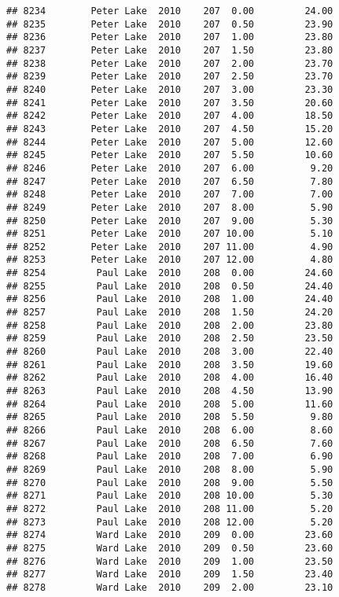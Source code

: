 \documentclass[
]{article}
\begin{document}
\begin{verbatim}
## 8234        Peter Lake  2010    207  0.00         24.00
## 8235        Peter Lake  2010    207  0.50         23.90
## 8236        Peter Lake  2010    207  1.00         23.80
## 8237        Peter Lake  2010    207  1.50         23.80
## 8238        Peter Lake  2010    207  2.00         23.70
## 8239        Peter Lake  2010    207  2.50         23.70
## 8240        Peter Lake  2010    207  3.00         23.30
## 8241        Peter Lake  2010    207  3.50         20.60
## 8242        Peter Lake  2010    207  4.00         18.50
## 8243        Peter Lake  2010    207  4.50         15.20
## 8244        Peter Lake  2010    207  5.00         12.60
## 8245        Peter Lake  2010    207  5.50         10.60
## 8246        Peter Lake  2010    207  6.00          9.20
## 8247        Peter Lake  2010    207  6.50          7.80
## 8248        Peter Lake  2010    207  7.00          7.00
## 8249        Peter Lake  2010    207  8.00          5.90
## 8250        Peter Lake  2010    207  9.00          5.30
## 8251        Peter Lake  2010    207 10.00          5.10
## 8252        Peter Lake  2010    207 11.00          4.90
## 8253        Peter Lake  2010    207 12.00          4.80
## 8254         Paul Lake  2010    208  0.00         24.60
## 8255         Paul Lake  2010    208  0.50         24.40
## 8256         Paul Lake  2010    208  1.00         24.40
## 8257         Paul Lake  2010    208  1.50         24.20
## 8258         Paul Lake  2010    208  2.00         23.80
## 8259         Paul Lake  2010    208  2.50         23.50
## 8260         Paul Lake  2010    208  3.00         22.40
## 8261         Paul Lake  2010    208  3.50         19.60
## 8262         Paul Lake  2010    208  4.00         16.40
## 8263         Paul Lake  2010    208  4.50         13.90
## 8264         Paul Lake  2010    208  5.00         11.60
## 8265         Paul Lake  2010    208  5.50          9.80
## 8266         Paul Lake  2010    208  6.00          8.60
## 8267         Paul Lake  2010    208  6.50          7.60
## 8268         Paul Lake  2010    208  7.00          6.90
## 8269         Paul Lake  2010    208  8.00          5.90
## 8270         Paul Lake  2010    208  9.00          5.50
## 8271         Paul Lake  2010    208 10.00          5.30
## 8272         Paul Lake  2010    208 11.00          5.20
## 8273         Paul Lake  2010    208 12.00          5.20
## 8274         Ward Lake  2010    209  0.00         23.60
## 8275         Ward Lake  2010    209  0.50         23.60
## 8276         Ward Lake  2010    209  1.00         23.50
## 8277         Ward Lake  2010    209  1.50         23.40
## 8278         Ward Lake  2010    209  2.00         23.10

\end{verbatim}
\end{document}
